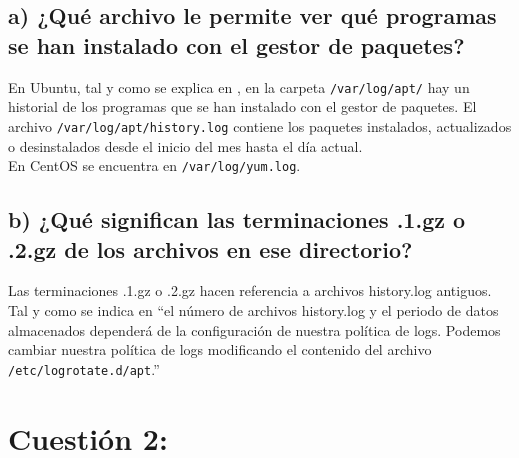 \subsection{a) ¿Qué archivo le permite ver qué programas se han instalado con el gestor de paquetes?}

En Ubuntu, tal y como se explica en \cite{logApt}, en la carpeta \texttt{/var/log/apt/} hay un historial de los programas que se han instalado con el gestor de paquetes. El archivo \texttt{/var/log/apt/history.log} contiene los paquetes instalados, actualizados o desinstalados desde el inicio del mes hasta el día actual.\\
En CentOS se encuentra en \texttt{/var/log/yum.log}.

\subsection{b) ¿Qué significan las terminaciones .1.gz o .2.gz de los archivos en ese directorio?}
Las terminaciones .1.gz o .2.gz hacen referencia a archivos history.log antiguos. Tal y como se indica en \cite{logApt} ``el número de archivos history.log y el periodo de datos almacenados dependerá de la configuración de nuestra política de logs. Podemos cambiar nuestra política de logs modificando el contenido del archivo \texttt{/etc/logrotate.d/apt}.''







\section{Cuestión 2:}

